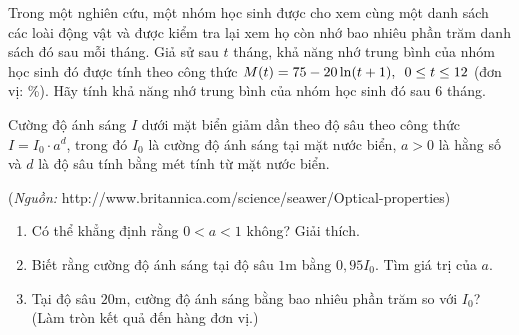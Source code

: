 \begin{bt}%
	Trong một nghiên cứu, một nhóm học sinh được cho xem cùng một danh sách các loài động vật và được kiểm tra lại xem họ còn nhớ bao nhiêu phần trăm danh sách đó sau mỗi tháng. Giả sử sau $t$ tháng, khả năng nhớ trung bình của nhóm học sinh đó được tính theo công thức $M(t) = 75 - 20 \ln (t+1), \enskip 0 \leq t \leq 12$ (đơn vị: \%). Hãy tính khả năng nhớ trung bình của nhóm học sinh đó sau 6 tháng.
\end{bt}
\begin{bt}%
	Cường độ ánh sáng $I$ dưới mặt biển giảm dần theo độ sâu theo công thức $I=I_0\cdot a^d$, trong đó $I_0$ là cường độ ánh sáng tại mặt nước biển, $a>0$ là hằng số và $d$ là độ sâu tính bằng mét tính từ mặt nước biển.
	\begin{center}
		(\textit{Nguồn:}  http://www.britannica.com/science/seawer/Optical-properties)
	\end{center}
	\begin{enumerate}
		\item Có thể khẳng định rằng $0<a<1$ không? Giải thích.
		\item Biết rằng cường độ ánh sáng tại độ sâu $1$m bằng $0{,}95I_0$. Tìm giá trị của $a$.
		\item Tại độ sâu $20$m, cường độ ánh sáng bằng bao nhiêu phần trăm so với $I_0$? (Làm tròn kết quả đến hàng đơn vị.)
	\end{enumerate}
\end{bt}
